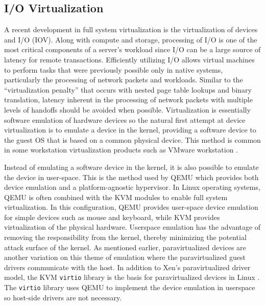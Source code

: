 \subsection{I/O Virtualization}
\label{sec:vt_io}
A recent development in full system virtualization is the virtualization of devices and I/O (IOV).
Along with compute and storage, processing of I/O is one of the most critical components of a server's workload since I/O can be a large source of latency for remote transactions.
Efficiently utilizing I/O allows virtual machines to perform tasks that were previously possible only in native systems, particularly the processing of network packets and workloads.
Similar to the ``virtualization penalty'' that occurs with nested page table lookups and binary translation, latency inherent in the processing of network packets with multiple levels of handoffs should be avoided when possible.
Virtualization is essentially software emulation of hardware devices so the natural first attempt at device virtualization is to emulate a device in the kernel, providing a software device to the guest OS that is based on a common physical device.
This method is common in some workstation virtualization products such as VMware workstation \autocite{_jones_1}.

Instead of emulating a software device in the kernel, it is also possible to emulate the device in user-space.
This is the method used by QEMU which provides both device emulation and a platform-agnostic hypervisor.
In Linux operating systems, QEMU is often combined with the KVM modules to enable full system virtualization. 
In this configuration, QEMU provides user-space device emulation for simple devices such as mouse and keyboard, while KVM provides virtualization of the physical hardware.
Userspace emulation has the advantage of removing the responsibility from the kernel, thereby minimizing the potential attack surface of the kernel.
As mentioned earlier, paravirtualized devices are another variation on this theme of emulation where the paravirtualized guest drivers communicate with the host.
In addition to Xen's paravirtualized driver model, the KVM \texttt{virtio} library is the basis for paravirtualized devices in Linux \autocite{_virtio_1}.
The \texttt{virtio} library uses QEMU to implement the device emulation in userspace so host-side drivers are not necessary.

